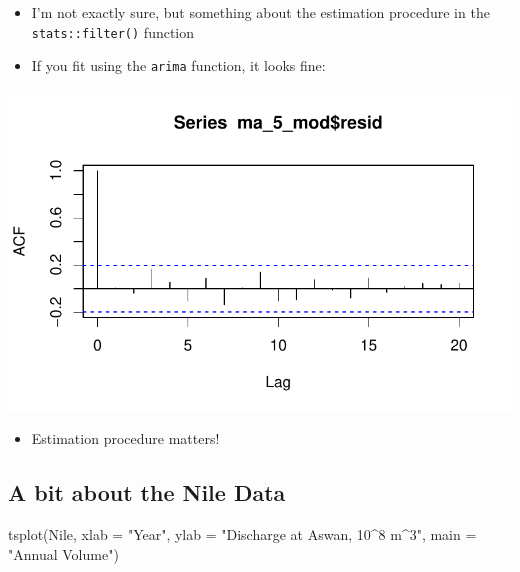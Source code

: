\documentclass[
  letterpaper,
  DIV=11,
  numbers=noendperiod]{scrartcl}
\newenvironment{Shaded}{\begin{snugshade}}{\end{snugshade}}
\newcommand{\AttributeTok}[1]{\textcolor[rgb]{0.40,0.45,0.13}{#1}}
\newcommand{\DecValTok}[1]{\textcolor[rgb]{0.68,0.00,0.00}{#1}}
\newcommand{\FunctionTok}[1]{\textcolor[rgb]{0.28,0.35,0.67}{#1}}
\newcommand{\NormalTok}[1]{\textcolor[rgb]{0.00,0.23,0.31}{#1}}
\newcommand{\OtherTok}[1]{\textcolor[rgb]{0.00,0.23,0.31}{#1}}
\newcommand{\SpecialCharTok}[1]{\textcolor[rgb]{0.37,0.37,0.37}{#1}}
\newcommand{\StringTok}[1]{\textcolor[rgb]{0.13,0.47,0.30}{#1}}
\providecommand{\tightlist}{%
  \setlength{\itemsep}{0pt}\setlength{\parskip}{0pt}}\usepackage{longtable,booktabs,array}
\begin{document}
\begin{itemize}
\item
  I'm not exactly sure, but something about the estimation procedure in
  the \texttt{stats::filter()} function
\item
  If you fit using the \texttt{arima} function, it looks fine:
\end{itemize}

\begin{Shaded}
\end{Shaded}

\includegraphics{Lecture7_files/figure-pdf/unnamed-chunk-24-1.pdf}

\begin{itemize}
\tightlist
\item
  Estimation procedure matters!
\end{itemize}

\subsection{A bit about the Nile Data}\label{a-bit-about-the-nile-data}

\begin{Shaded}
\begin{Highlighting}[]
\FunctionTok{tsplot}\NormalTok{(Nile, }\AttributeTok{xlab =} \StringTok{"Year"}\NormalTok{, }\AttributeTok{ylab =} \StringTok{"Discharge at Aswan, 10\^{}8 m\^{}3"}\NormalTok{, }\AttributeTok{main =} \StringTok{"Annual Volume"}\NormalTok{)}
\end{Highlighting}
\end{Shaded}
\end{document}
